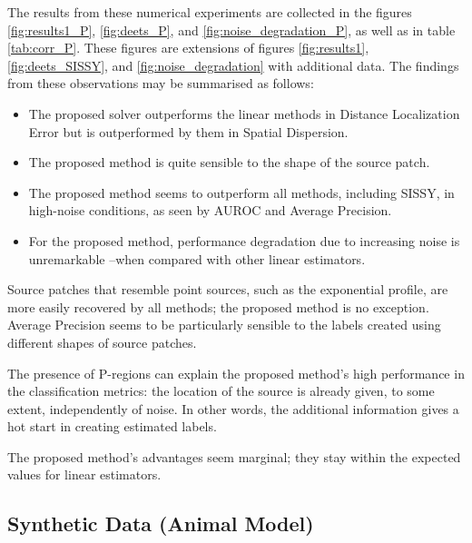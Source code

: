 The results from these numerical experiments are collected in the
figures \ref{fig:results1_P}, \ref{fig:deets_P}, and \ref{fig:noise_degradation_P}, as well as in table \ref{tab:corr_P}.
%
These figures are extensions of figures
\ref{fig:results1}, \ref{fig:deets_SISSY}, and \ref{fig:noise_degradation} with additional data.
%
%
The findings from these observations may be summarised as follows:
\begin{itemize}
    \item The proposed solver outperforms the linear methods in Distance Localization Error but is outperformed by them in Spatial Dispersion.
    \item The proposed method is quite sensible to the shape of the source patch. 
    \item The proposed method seems to outperform all methods, including SISSY, in high-noise conditions, as seen by AUROC and Average Precision.
    \item For the proposed method, performance degradation due to increasing noise is unremarkable --when compared with other linear estimators.
\end{itemize}

Source patches that resemble point sources, such as the exponential profile, are more easily recovered by all methods; the proposed method is no exception.
%
Average Precision seems to be particularly sensible to the labels created using different shapes of source patches.

The presence of P-regions can explain the proposed method's high performance in the classification metrics: the location of the source is already given, to some extent, independently of noise.
%
In other words, the additional information gives a hot start in creating estimated labels.

The proposed method's advantages seem marginal; they stay within the expected values for linear estimators.

\subsection{Synthetic Data (Animal Model)}

%
%

